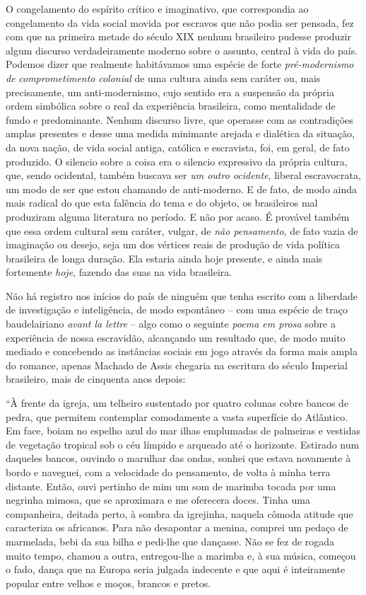 O congelamento do espírito crítico e imaginativo, que correspondia ao
congelamento da vida social movida por escravos que não podia ser
pensada, fez com que na primeira metade do século XIX nenhum brasileiro
pudesse produzir algum discurso verdadeiramente moderno sobre o assunto,
central à vida do país. Podemos dizer que realmente habitávamos uma
espécie de forte \emph{pré-modernismo de} \emph{comprometimento}
\emph{colonial} de uma cultura ainda sem caráter ou, mais precisamente,
um anti-modernismo, cujo sentido era a suspensão da própria ordem
simbólica sobre o real da experiência brasileira, como mentalidade de
fundo e predominante. Nenhum discurso livre, que operasse com as
contradições amplas presentes e desse uma medida minimante arejada e
dialética da situação, da nova nação, de vida social antiga, católica e
escravista, foi, em geral, de fato produzido. O silencio sobre a coisa
era o silencio expressivo da própria cultura, que, sendo ocidental,
também buscava ser \emph{um outro ocidente}, liberal escravocrata, um
modo de ser que estou chamando de anti-moderno. E de fato, de modo ainda
mais radical do que esta falência do tema e do objeto, os brasileiros
mal produziram alguma literatura no período. E não por acaso. É provável
também que essa ordem cultural sem caráter, vulgar, de \emph{não
pensamento}, de fato vazia de imaginação ou desejo, seja um dos vértices
reais de produção de vida política brasileira de longa duração. Ela
estaria ainda hoje presente, e ainda mais fortemente \emph{hoje},
fazendo das suas na vida brasileira.

Não há registro nos inícios do país de ninguém que tenha escrito com a
liberdade de investigação e inteligência, de modo espontâneo -- com uma
espécie de traço baudelairiano \emph{avant la lettre} -- algo como o
seguinte \emph{poema em prosa} sobre a experiência de nossa escravidão,
alcançando um resultado que, de modo muito mediado e concebendo as
instâncias sociais em jogo através da forma mais ampla do romance,
apenas Machado de Assis chegaria na escritura do século Imperial
brasileiro, mais de cinquenta anos depois:

``À frente da igreja, um telheiro sustentado por quatro colunas cobre
bancos de pedra, que permitem contemplar comodamente a vasta superfície
do Atlântico. Em face, boiam no espelho azul do mar ilhas emplumadas de
palmeiras e vestidas de vegetação tropical sob o céu límpido e arqueado
até o horizonte. Estirado num daqueles bancos, ouvindo o marulhar das
ondas, sonhei que estava novamente à bordo e naveguei, com a velocidade
do pensamento, de volta à minha terra distante. Então, ouvi pertinho de
mim um som de marimba tocada por uma negrinha mimosa, que se aproximara
e me oferecera doces. Tinha uma companheira, deitada perto, à sombra da
igrejinha, naquela cômoda atitude que caracteriza os africanos. Para não
desapontar a menina, comprei um pedaço de marmelada, bebi da sua bilha e
pedi-lhe que dançasse. Não se fez de rogada muito tempo, chamou a outra,
entregou-lhe a marimba e, à sua música, começou o fado, dança que na
Europa seria julgada indecente e que aqui é inteiramente popular entre
velhos e moços, brancos e pretos.

